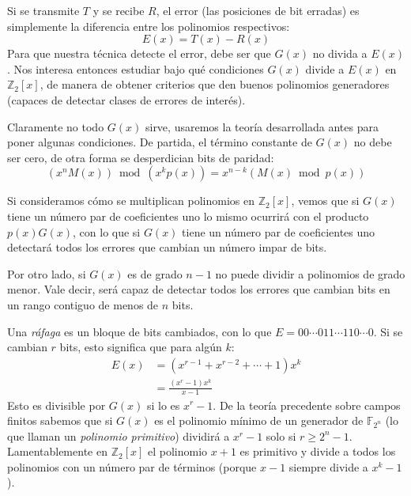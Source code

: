   Si se transmite \(T\) y se recibe \(R\),
  el error
  (las posiciones de bit erradas)
  es simplemente la diferencia entre los polinomios respectivos:%
  \begin{equation*}
    E(x)
      = T(x) - R(x)
  \end{equation*}
  Para que nuestra técnica detecte el error,
  debe ser que \(G(x)\) no divida a \(E(x)\).
  Nos interesa entonces estudiar bajo qué condiciones \(G(x)\)
  divide a \(E(x)\) en \(\mathbb{Z}_2[x]\),
  de manera de obtener criterios
  que den buenos polinomios generadores
  (capaces de detectar clases de errores de interés).

  Claramente no todo \(G(x)\) sirve,
  usaremos la teoría desarrollada antes
  para poner algunas condiciones.
  De partida,
  el término constante de \(G(x)\)
  no debe ser cero,
  de otra forma se desperdician bits de paridad:
  \begin{equation*}
    \left( x^n M(x) \right) \bmod \left( x^k p(x) \right)
      = x^{n - k} \left( M(x) \bmod p(x) \right)
  \end{equation*}

  Si consideramos cómo se multiplican polinomios
  en \(\mathbb{Z}_2[x]\),
  vemos que si \(G(x)\) tiene un número par de coeficientes uno
  lo mismo ocurrirá con el producto \(p(x) G(x)\),
  con lo que si \(G(x)\) tiene un número par de coeficientes uno
  detectará todos los errores que cambian un número impar de bits.

  Por otro lado,
  si \(G(x)\) es de grado \(n - 1\)
  no puede dividir a polinomios de grado menor.
  Vale decir,
  será capaz de detectar todos los errores
  que cambian bits en un rango contiguo de menos de \(n\) bits.

  Una \emph{ráfaga}%
  es un bloque de bits cambiados,
  con lo que \(E = 0 0 \dotsm 0 1 1 \dotsm 1 1 0 \dotsm 0\).
  Si se cambian \(r\) bits,
  esto significa que para algún \(k\):
  \begin{align*}
    E(x)
      &= (x^{r - 1} + x^{r - 2} + \dotsb + 1) x^k \\
      &= \frac{(x^r - 1) x^k}{x - 1}
  \end{align*}
  Esto es divisible por \(G(x)\) si lo es \(x^r - 1\).
  De la teoría precedente sobre campos finitos
  sabemos que si \(G(x)\)
  es el polinomio mínimo de un generador de \(\mathbb{F}_{2^n}\)
  (lo que llaman un \emph{polinomio primitivo})
  dividirá a \(x^r - 1\) solo si \(r \ge 2^n - 1\).
  Lamentablemente
  en \(\mathbb{Z}_2[x]\) el polinomio \(x + 1\) es primitivo
  y divide a todos los polinomios con un número par de términos
  (porque \(x - 1\) siempre divide a \(x^k - 1\)).

